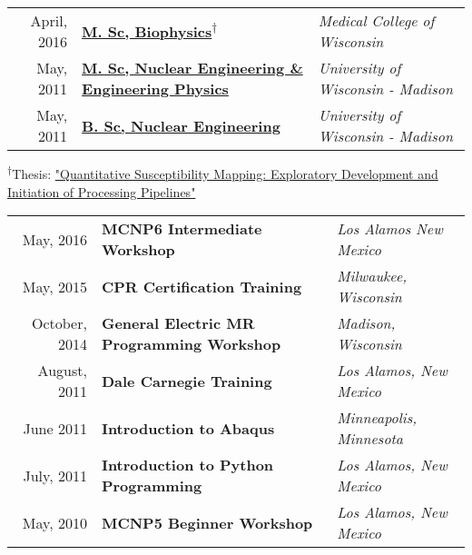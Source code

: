 


\begin{minipage}{\textwidth}
	\begin{tabular}{r|ll}
	April, 2016 &	\href{https://app.box.com/s/62ffckadt53x8k93p9gp6ylbpqj9vscw}{\textbf{M. Sc, Biophysics}}\textsuperscript{$\dagger$} & \emph{Medical College of Wisconsin} \\ %
	May, 2011 & \href{https://app.box.com/s/yyxi60lex92ovm7dus1d5xu9xshdqd91}{\textbf{M. Sc, Nuclear Engineering \& Engineering Physics}} & \emph{University of Wisconsin - Madison} \\ %
	May, 2011 & \href{https://app.box.com/s/yyxi60lex92ovm7dus1d5xu9xshdqd91}{\textbf{B. Sc, Nuclear Engineering}} & \emph{University of Wisconsin - Madison}\\ %
	\end{tabular}
\end{minipage}

\begin{minipage}{\textwidth}
	\textsuperscript{$\dagger$}Thesis: \href{https://app.box.com/s/o8kksc6n51qpjzc3clfa127xtdfkayzd}{\normalsize"Quantitative Susceptibility Mapping: Exploratory Development and Initiation of Processing Pipelines"}
\end{minipage}


\begin{minipage}{\textwidth}
	\begin{tabular}{r|ll}
		May, 2016 & \textbf{MCNP6 Intermediate Workshop} &  \textit{Los Alamos New Mexico}  \\
		May, 2015 & \textbf{CPR Certification Training}  &  \textit{Milwaukee, Wisconsin}  \\
		October, 2014 & \textbf{General Electric MR Programming Workshop} & \textit{Madison, Wisconsin}  \\
		August, 2011 & \textbf{Dale Carnegie Training} & \textit{Los Alamos, New Mexico}  \\
		June 2011 & \textbf{Introduction to Abaqus} & \textit{Minneapolis, Minnesota} \\
		July, 2011 & \textbf{Introduction to Python Programming} & \textit{Los Alamos, New Mexico} \\
		May, 2010 & \textbf{MCNP5 Beginner Workshop} & \textit{Los Alamos, New Mexico} \\
	\end{tabular}
\end{minipage}


